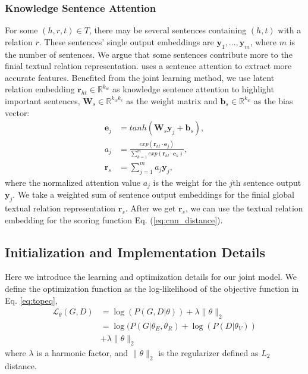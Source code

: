 \documentclass[11pt,a4paper]{article}
\begin{document}
\subsubsection{Knowledge Sentence Attention}
For some $(h, r, t) \in T$, there may be several sentences containing $(h, t)$ with a relation $r$. These sentences' single output embeddings are ${\mathbf{y}_1, \ldots , \mathbf{y}_m}$, where $m$ is the number of sentences. We argue that some sentences contribute more to the finial textual relation representation. \cite{lin2016neural} uses a sentence attention to extract more accurate features. Benefited from the joint learning method, we use latent relation embedding $\mathbf{r}_{ht} \in \mathbb{R}^{k_w} $ as knowledge sentence attention to highlight important sentences, $\mathbf{W}_s \in \mathbb{R}^{k_wk_c}$ as the weight matrix and $\mathbf{b}_s \in \mathbb{R}^{k_w}$ as the bias vector:
\begin{align}
\mathbf{e}_j & = tanh(\mathbf{W}_s\mathbf{y}_j+\mathbf{b}_s), \\\nonumber
a_j & =\frac{exp(\mathbf{r}_{ht}\cdot\mathbf{e}_j)}{\sum_{k = 1}^{m} exp(\mathbf{r}_{ht}\cdot\mathbf{e}_k)}, \\\nonumber
\mathbf{r}_s & = \sum_{j = 1}^{m} a_j\mathbf{y}_j,
\end{align}
where the normalized attention value $a_j$ is the weight for the $j$th sentence output $\mathbf{y}_j$. We take a weighted sum of sentence output embeddings for the finial global textual relation representation $\mathbf{r}_s$. After we get $\mathbf{r}_s$, we can use the textual relation embedding for the scoring function Eq. (\ref{eq:cnn_distance}).

\subsection{Initialization and Implementation Details}
\label{sec:detail}
Here we introduce the learning and optimization details for our joint model. We define the optimization function as the log-likelihood of the objective function in Eq. \ref{eq:topeq},
\begin{align}
\mathcal{L}_{\theta}(G, D) & = \log(P(G,D|{\theta})) + \lambda \lVert \theta \rVert_2 \\\nonumber
 & = \log(P(G|{\theta_E, \theta_R}) + \log(P(D|{\theta_V})) \\\nonumber
 & + \lambda \lVert \theta \rVert_2
\end{align}
where $\lambda$ is a harmonic factor, and $\lVert \theta \rVert_2$ is the regularizer defined as $L_2$ distance.
\end{document}
